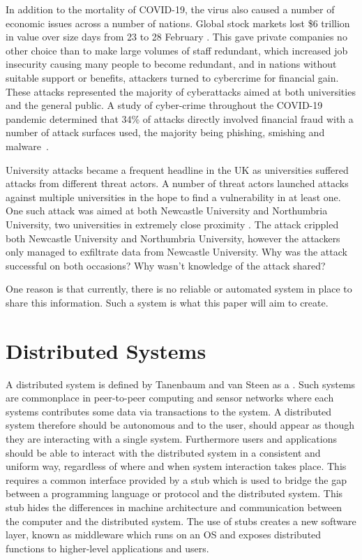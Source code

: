 \documentclass[a4paper, 11pt]{report}
\begin{document}
In addition to the mortality of COVID-19, the virus also caused a number of economic issues across a number of nations. Global stock markets lost \$6 trillion in value over size days from 23 to 28 February \cite{covspill}. This gave private companies no other choice than to make large volumes of staff redundant, which increased job insecurity causing many people to become redundant, and in nations without suitable support or benefits, attackers turned to cybercrime for financial gain. These attacks represented the majority of cyberattacks aimed at both universities and the general public. A study of cyber-crime throughout the COVID-19 pandemic determined that 34\% of attacks directly involved financial fraud with a number of attack surfaces used, the majority being \gls{phishing}, \gls{smishing} and \gls{malware}~\cite{diffattack}.

University attacks became a frequent headline in the UK as universities suffered attacks from different threat actors. A number of threat actors launched attacks against multiple universities in the hope to find a vulnerability in at least one. One such attack was aimed at both Newcastle University and Northumbria University, two universities in extremely close proximity \cite{newhack,norhack}. The attack crippled both Newcastle University and Northumbria University, however the attackers only managed to exfiltrate data from Newcastle University. Why was the attack successful on both occasions? Why wasn't knowledge of the attack shared? 

One reason is that currently, there is no reliable or automated system in place to share this information. Such a system is what this paper will aim to create. 

\section{Distributed Systems} \label{distributed}
A distributed system is defined by Tanenbaum and van Steen as a  \cite{tanenbaumdist}. Such systems are commonplace in peer-to-peer computing and sensor networks where each systems contributes some data via transactions to the system. A distributed system therefore should be autonomous and to the user, should appear as though they are interacting with a single system. Furthermore users and applications should be able to interact with the distributed system in a consistent and uniform way, regardless of where and when system interaction takes place. This requires a common interface provided by a \gls{stub} which is used to bridge the gap between a programming language or protocol and the distributed system. This \gls{stub} hides the differences in machine architecture and communication between the computer and the distributed system. The use of \gls{stub}s creates a new software layer, known as \gls{middleware} which runs on an \acrfull{OS} and exposes distributed functions to higher-level applications and users.
\end{document}
